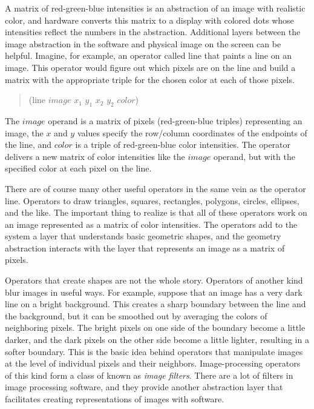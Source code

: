 A matrix of red-green-blue
intensities is an abstraction of an image with realistic color,
and hardware converts this matrix to a display with colored dots
whose intensities reflect the numbers in the abstraction.
Additional layers between the image abstraction in the software and
physical image on the screen can be helpful.
Imagine, for example, an operator called \textsf{line}
that paints a line on an image. This operator would figure out
which pixels are on the line and build a matrix with
the appropriate triple for the chosen color at each of those pixels.
\begin{quote}
    \textsf{(line} $image$ $x_1$ $y_1$ $x_2$ $y_2$ $color$\textsf{)}
\end{quote}
The $image$ operand is a matrix of pixels (red-green-blue triples)
representing an image, the $x$ and $y$ values
specify the row/column coordinates of the endpoints of the line,
and $color$ is a triple of red-green-blue color intensities.
The operator delivers a new matrix of color intensities
like the $image$ operand, but with the specified color
at each pixel on the line.

There are of course many other useful operators in
the same vein as the operator \textsf{line}. Operators to draw
triangles, squares, rectangles, polygons, circles,
ellipses, and the like. The important thing to realize is that all of
these operators work on an image represented as a matrix of
color intensities.
The operators add to the system a layer that understands
basic geometric shapes, and the geometry abstraction
interacts with the layer that represents an image as a matrix of pixels.

Operators that create shapes are not the whole story.
Operators of another kind blur images in useful ways.
For example, suppose that an image has a
very dark line on a bright background. This creates a
sharp boundary between the line and the background, but it can be
smoothed out by averaging the colors of neighboring pixels.
The bright pixels on one side of the boundary become a little darker,
and the dark pixels on the other side become a little lighter,
resulting in a softer boundary. This is the basic idea behind
operators that manipulate images at the level
of individual pixels and their neighbors. Image-processing operators
of this kind form a class of  known as \emph{image filters}.
There are a lot of filters in image
processing software, and they provide another abstraction layer
that facilitates creating representations of images with software.

